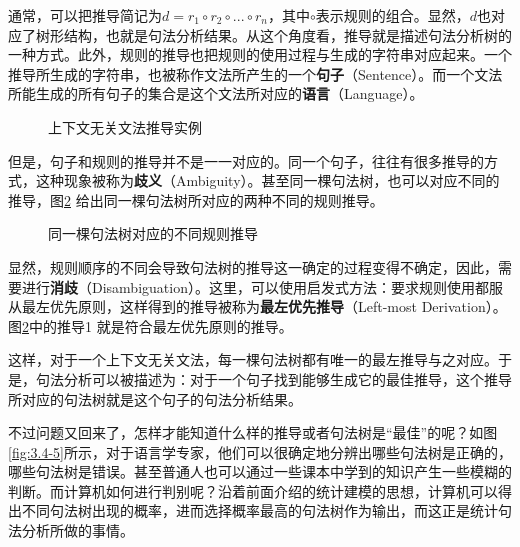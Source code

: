 \parinterval 通常，可以把推导简记为$d=r_1 \circ r_2 \circ ... \circ r_n$，其中$ \circ $表示规则的组合。显然，$d$也对应了树形结构，也就是句法分析结果。从这个角度看，推导就是描述句法分析树的一种方式。此外，规则的推导也把规则的使用过程与生成的字符串对应起来。一个推导所生成的字符串，也被称作文法所产生的一个{\small\sffamily\bfseries{句子}}（Sentence）。而一个文法所能生成的所有句子的集合是这个文法所对应的{\small\sffamily\bfseries{语言}}（Language）。

\begin{figure}[htp]
    \centering

	\caption{上下文无关文法推导实例}
    \label{fig:3.4-3}
\end{figure}

\parinterval 但是，句子和规则的推导并不是一一对应的。同一个句子，往往有很多推导的方式，这种现象被称为{\small\sffamily\bfseries{歧义}}（Ambiguity）。甚至同一棵句法树，也可以对应不同的推导，图\ref{fig:3.4-4} 给出同一棵句法树所对应的两种不同的规则推导。

\begin{figure}[htp]
    \centering

\setlength{\abovecaptionskip}{-0.5em}
	\caption{同一棵句法树对应的不同规则推导}
    \label{fig:3.4-4}
\end{figure}

\parinterval 显然，规则顺序的不同会导致句法树的推导这一确定的过程变得不确定，因此，需要进行{\small\sffamily\bfseries{消歧}}（Disambiguation）。这里，可以使用启发式方法：要求规则使用都服从最左优先原则，这样得到的推导被称为{\small\sffamily\bfseries{最左优先推导}}（Left-most Derivation）。图\ref{fig:3.4-4}中的推导1 就是符合最左优先原则的推导。

\parinterval 这样，对于一个上下文无关文法，每一棵句法树都有唯一的最左推导与之对应。于是，句法分析可以被描述为：对于一个句子找到能够生成它的最佳推导，这个推导所对应的句法树就是这个句子的句法分析结果。

\parinterval 不过问题又回来了，怎样才能知道什么样的推导或者句法树是“最佳”的呢？如图\ref{fig:3.4-5}所示，对于语言学专家，他们可以很确定地分辨出哪些句法树是正确的，哪些句法树是错误。甚至普通人也可以通过一些课本中学到的知识产生一些模糊的判断。而计算机如何进行判别呢？沿着前面介绍的统计建模的思想，计算机可以得出不同句法树出现的概率，进而选择概率最高的句法树作为输出，而这正是统计句法分析所做的事情。

